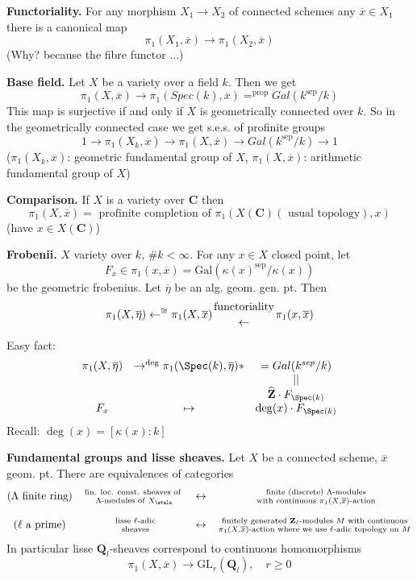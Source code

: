 \medskip\noindent
{\bf Functoriality.} For any morphism $X_1\to X_2$ of connected schemes
any $\overline{x}\in X_1$ there is a canonical map
$$
\pi_1(X_1, \overline{x}) \to \pi_1(X_2, \overline{x})
$$
(Why? because the fibre functor ...)

\medskip\noindent
{\bf Base field.} Let $X$ be a variety over a field $k$. Then we get
$$
\pi_1(X, \overline{x}) \to
\pi_1(Spec(k), \overline{x}) =^{\text{prop}} Gal(k^{\text{sep}}/k)
$$
This map is surjective if and only if $X$ is geometrically connected over $k$.
So in the geometrically connected case we get s.e.s. of profinite
groups
$$
1 \to \pi_1(X_{\overline{k}}, \overline{x}) \to
\pi_1(X, \overline{x}) \to
Gal(k^{\text{sep}}/k) \to 1
$$
($\pi_1(X_{\overline{k}}, \overline{x})$: geometric fundamental group of
$X$, $\pi_1(X, \overline{x})$: arithmetic fundamental group of $X$)

\medskip\noindent
{\bf Comparison.} If $X$ is a variety over $\mathbf{C}$ then
$$
\pi_1(X, \overline{x}) =
\text{ profinite completion of }
\pi_1(X(\mathbf{C})(\text{ usual topology}), x)
$$
(have $x\in X(\mathbf{C})$)

\medskip\noindent
{\bf Frobenii.} $X$ variety over $k$, $\# k < \infty$. For any $x \in X$
closed point, let
$$
F_x\in \pi_1(x, \overline{x}) =
\text{Gal}(\kappa(x)^{\text{sep}}/\kappa(x))
$$
be the geometric frobenius.
Let $\overline\eta$ be an alg. geom. gen. pt. Then
$$
\pi_1(X, \overline\eta) \leftarrow^{\cong}
\pi_1(X, \overline{x})
{\text{functoriality} \atop \leftarrow} \pi_1(x, \overline{x})
$$

\noindent
Easy fact:
$$
\begin{matrix}
\pi_1(X, \overline \eta) & \to^{\deg} \pi_1(\Spec(k), \overline \eta) * &
= Gal(k^{sep}/k) \\
& & || \\
& & \widehat{\mathbf{Z}}\cdot F_{\Spec(k)} \\
F_x & \mapsto & \deg(x)\cdot F_{\Spec(k)}
\end{matrix}
$$
Recall: $\deg(x) = [\kappa(x):k]$

\medskip\noindent
{\bf Fundamental groups and lisse sheaves.}
Let $X$ be a connected scheme, $\overline{x}$ geom. pt. There are
equivalences of categories
$$
\begin{matrix}
(\Lambda\text{ finite ring}) &
\text{fin. loc. const. sheaves of }
\atop \Lambda\text{-modules of }X_\etale & \leftrightarrow &
\text{ finite (discrete) }\Lambda\text{-modules}
\atop \text{ with continuous }\pi_1(X, \overline{x})\text{-action}\\
\\
(\ell\text{ a prime}) & \text{ lisse }\ell\text{-adic} \atop \text{ sheaves} &
\leftrightarrow &
\text{finitely generated }\mathbf{Z}_\ell
\text{-modules }M\text{ with continuous}
\atop \pi_1(X, \overline{x})\text{-action where we use }
\ell\text{-adic topology on }M
\end{matrix}
$$
In particular lisse $\mathbf{Q}_l$-sheaves correspond to continuous
homomorphisms
$$
\pi_1(X, \overline{x}) \to \text{GL}_r(\mathbf{Q}_l), \quad r\geq 0
$$

